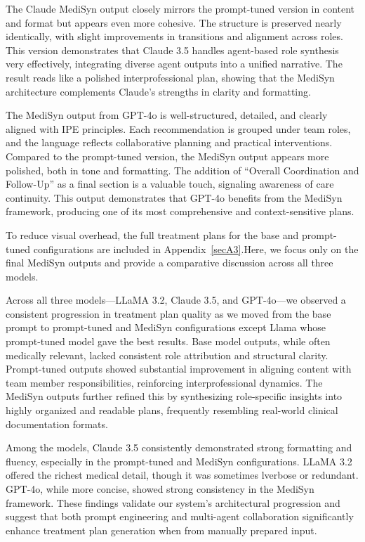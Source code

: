 \documentclass[pdflatex,sn-mathphys-num]{sn-jnl}%
\theoremstyle{thmstyleone}%
\theoremstyle{thmstyletwo}%
\theoremstyle{thmstylethree}%
\begin{document}
The Claude MediSyn output closely mirrors the prompt-tuned version in content and format but appears even more cohesive. The structure is preserved nearly identically, with slight improvements in transitions and alignment across roles. This version demonstrates that Claude 3.5 handles agent-based role synthesis very effectively, integrating diverse agent outputs into a unified narrative. The result reads like a polished interprofessional plan, showing that the MediSyn architecture complements Claude’s strengths in clarity and formatting.

The MediSyn output from GPT-4o is well-structured, detailed, and clearly aligned with IPE principles. Each recommendation is grouped under team roles, and the language reflects collaborative planning and practical interventions. Compared to the prompt-tuned version, the MediSyn output appears more polished, both in tone and formatting. The addition of “Overall Coordination and Follow-Up” as a final section is a valuable touch, signaling awareness of care continuity. This output demonstrates that GPT-4o benefits from the MediSyn framework, producing one of its most comprehensive and context-sensitive plans.

\vspace{1ex}
\noindent
To reduce visual overhead, the full treatment plans for the base and prompt-tuned configurations are included in Appendix~\ref{secA3}.Here, we focus only on the final MediSyn outputs and provide a comparative discussion across all three models.
\vspace{1ex}


\noindent
Across all three models—LLaMA 3.2, Claude 3.5, and GPT-4o—we observed a consistent progression in treatment plan quality as we moved from the base prompt to prompt-tuned and MediSyn configurations except Llama whose prompt-tuned model gave the best results. Base model outputs, while often medically relevant, lacked consistent role attribution and structural clarity. Prompt-tuned outputs showed substantial improvement in aligning content with team member responsibilities, reinforcing interprofessional dynamics. The MediSyn outputs further refined this by synthesizing role-specific insights into highly organized and readable plans, frequently resembling real-world clinical documentation formats.

Among the models, Claude 3.5 consistently demonstrated strong formatting and fluency, especially in the prompt-tuned and MediSyn configurations. LLaMA 3.2 offered the richest medical detail, though it was sometimes lverbose or redundant. GPT-4o, while more concise, showed strong consistency in the MediSyn framework. These findings validate our system’s architectural progression and suggest that both prompt engineering and multi-agent collaboration significantly enhance treatment plan generation when from manually prepared input.
\end{document}
